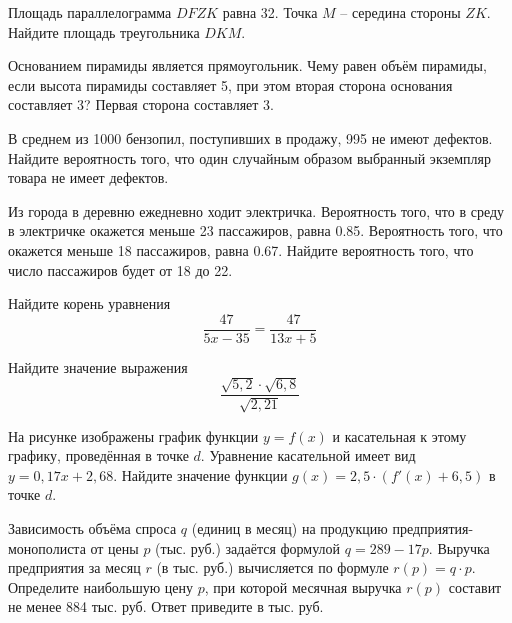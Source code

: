 
\begin{taskBN}{1}
Площадь параллелограмма $DFZK$ равна 32. Точка $M$ – середина стороны $ZK$. Найдите площадь треугольника $DKM$.
\end{taskBN}

\begin{taskBN}{2}
Основанием пирамиды является прямоугольник. Чему равен объём пирамиды, если высота пирамиды составляет 5, при этом вторая сторона основания составляет 3? Первая сторона составляет 3. 
\end{taskBN}

\begin{taskBN}{3}
В среднем из 1000 бензопил, поступивших в продажу, 995 не имеют дефектов. Найдите вероятность того, что один случайным образом выбранный экземпляр товара не имеет дефектов.
\end{taskBN}

\begin{taskBN}{4}
Из города в деревню ежедневно ходит электричка. Вероятность того, что в среду в электричке окажется меньше 23 пассажиров, равна 0.85. Вероятность того, что окажется меньше 18 пассажиров, равна 0.67. Найдите вероятность того, что число пассажиров будет от 18 до 22.
\end{taskBN}

\begin{taskBN}{5}
Найдите корень уравнения $$\frac{47}{5x-35}=\frac{47}{13x+5}$$
\end{taskBN}

\begin{taskBN}{6}
Найдите значение выражения $${\frac{\sqrt{5,2}\cdot\sqrt{6,8}}{\sqrt{2,21}}}$$
\end{taskBN}

\begin{taskBN}{7}
    На рисунке изображены график функции $y=f(x)$ и касательная к этому графику, проведённая в точке $d$. Уравнение касательной имеет вид $y=0{,}17 x+2{,}68$. Найдите значение функции $g(x) = 2{,}5\cdot(f'(x)+6{,}5)$ в точке $d$.
\end{taskBN}

\begin{taskBN}{8}
Зависимость объёма спроса $q$ (единиц в месяц) на продукцию предприятия-монополиста от цены $p$ (тыс. руб.) задаётся формулой $q=289-17p$. Выручка предприятия за месяц $r$ (в тыс. руб.) вычисляется по формуле $r(p)=q\cdot p$. Определите наибольшую цену $p$, при которой месячная выручка $r(p)$ составит не менее 884 тыс. руб. Ответ приведите в тыс. руб.
\end{taskBN}

